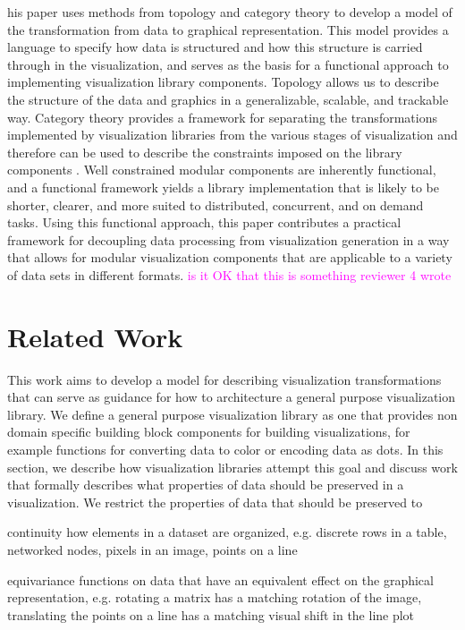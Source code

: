 \documentclass[10pt,journal,compsoc]{IEEEtran}
\newcommand{\note}[1]{\textcolor{magenta}{#1}}
\theoremstyle{definition}
\theoremstyle{remark}
\begin{document}
his paper uses methods from topology and category theory to develop a model of the transformation from data to graphical representation. This model provides a language to specify how data is structured and how this structure is carried through in the visualization, and serves as the basis for a functional approach to implementing visualization library components. Topology allows us to describe the structure of the data and graphics in a generalizable, scalable, and trackable way. Category theory provides a framework for separating the transformations implemented by visualization libraries from the various stages of visualization and therefore can be used to describe the constraints imposed on the library components \cite{wielsManagementEvolvingSpecifications1998,goguenCategoricalManifesto1991}. Well constrained modular components are inherently functional\cite{hughesWhyFunctionalProgramming1989}, and a functional framework yields a library implementation that is likely to be shorter, clearer, and more suited to distributed, concurrent, and on demand tasks\cite{huHowFunctionalProgramming2015}. Using this functional approach, this paper contributes a practical framework for decoupling data processing from visualization generation in a way that allows for modular visualization components that are applicable to a variety of data sets in different formats. \note{is it OK that this is something reviewer 4 wrote}



\section{Related Work}
This work aims to develop a model for describing visualization transformations that can serve as guidance for how to architecture a general purpose visualization library. We define a general purpose visualization library as one that provides non domain specific building block components\cite{wongsuphasawatNavigatingWideWorld2021} for building visualizations, for example functions for converting data to color or encoding data as dots. In this section, we describe how visualization libraries attempt this goal and discuss work that formally describes what properties of data should be preserved in a visualization. We restrict the properties of data that should be preserved to 

\begin{LaTeXdescription}
  \item [continuity] how elements in a dataset are organized, e.g. discrete rows in a table, networked nodes, pixels in an image, points on a line
  \item [equivariance] functions on data that have an equivalent effect on the graphical representation, e.g. rotating a matrix has a matching rotation of the image, translating the points on a line has a matching visual shift in the line plot
\end{LaTeXdescription}
\end{document}
